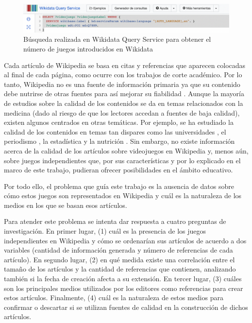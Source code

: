 \documentclass[spanish]{textolivre}
\begin{document}
\begin{figure}[htbp]
\centering
\begin{minipage}{.85\textwidth}
 \includegraphics[width=\textwidth]{Fig01.png}
 \caption{Búsqueda realizada en Wikidata Query Service para obtener el número de juegos introducidos en Wikidata}
 \label{fig01}
\end{minipage}
\end{figure}

Cada artículo de Wikipedia se basa en citas y referencias que aparecen colocadas al final de cada página, como ocurre con los trabajos de corte académico. Por lo tanto, Wikipedia no es una fuente de información primaria ya que su contenido debe nutrirse de otras fuentes para así mejorar su fiabilidad \cite{wikiciting7}. Aunque la mayoría de estudios sobre la calidad de los contenidos se da en temas relacionados con la medicina (dado al riesgo de que los lectores accedan a fuentes de baja calidad), existen algunos centrados en otras temáticas. Por ejemplo, se ha estudiado la calidad de los contenidos en temas tan dispares como las universidades \cite{claes_wikipedia_2020}, el periodismo \cite{morejon_llamas_mujeres_2021}, la estadística \cite{dunn_evaluating_2019} y la nutrición \cite{carrera_presence_2015}. Sin embargo, no existe información acerca de la calidad de los artículos sobre videojuegos en Wikipedia y, menos aún, sobre juegos independientes que, por sus características y por lo explicado en el marco de este trabajo, pudieran ofrecer posibilidades en el ámbito educativo.

Por todo ello, el problema que guía este trabajo es la ausencia de datos sobre cómo estos juegos son representados en Wikipedia y cuál es la naturaleza de los medios en los que se basan esos artículos.

Para atender este problema se intenta dar respuesta a cuatro preguntas de investigación. En primer lugar, (1) cuál es la presencia de los juegos independientes en Wikipedia y cómo se ordenarían sus artículos de acuerdo a dos variables (cantidad de información generada y número de referencias de cada artículo). En segundo lugar, (2) en qué medida existe una correlación entre el tamaño de los artículos y la cantidad de referencias que contienen, analizando también si la fecha de creación afecta a su extensión. En tercer lugar, (3) cuáles son los principales medios utilizados por los editores como referencias para crear estos artículos. Finalmente, (4) cuál es la naturaleza de estos medios para confirmar o descartar si se utilizan fuentes de calidad en la construcción de dichos artículos.
\end{document}
